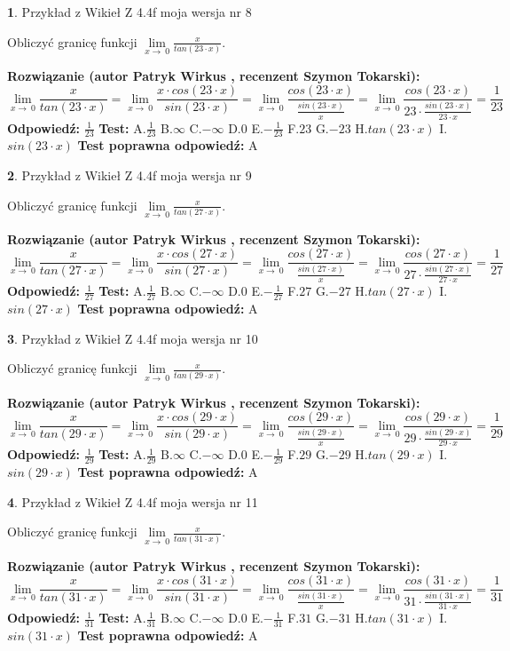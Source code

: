 \documentclass[12pt, a4paper]{article}
\theoremstyle{definition} %
\newtheorem{zad}{}
\newcommand{\zadStart}[1]{\begin{zad}#1\newline}
\newcommand{\zadStop}{\end{zad}}
\newcommand{\rozwStart}[2]{\noindent \textbf{Rozwiązanie (autor #1 , recenzent #2): }\newline}
\newcommand{\rozwStop}{\newline}
\newcommand{\odpStart}{\noindent \textbf{Odpowiedź:}\newline}
\newcommand{\odpStop}{\newline}
\newcommand{\testStart}{\noindent \textbf{Test:}\newline}
\newcommand{\testStop}{\newline}
\newcommand{\kluczStart}{\noindent \textbf{Test poprawna odpowiedź:}\newline}
\newcommand{\kluczStop}{\newline}
\begin{document}
\zadStart{Przykład z Wikieł Z 4.4f moja wersja nr 8}


Obliczyć granicę funkcji $\lim\limits_{x\to\ 0}\frac{x}{tan(23 \cdot x)}$.
\zadStop
\rozwStart{Patryk Wirkus}{Szymon Tokarski}
$$\lim\limits_{x\to\ 0}\frac{x}{tan(23 \cdot x)}=\lim\limits_{x\to\ 0}\frac{x \cdot cos(23 \cdot x)}{sin(23 \cdot x)}=\lim\limits_{x\to\ 0}\frac{cos(23 \cdot x)}{\frac{sin(23 \cdot x)}{x}}=\lim\limits_{x\to\ 0}\frac{cos(23 \cdot x)}{23 \cdot \frac{sin(23 \cdot x)}{23 \cdot x}} = \frac{1}{23}$$
\rozwStop
\odpStart
$\frac{1}{23}$
\odpStop
\testStart
A.$\frac{1}{23}$
B.$\infty$
C.$-\infty$
D.$0$
E.$-\frac{1}{23}$
F.$23$
G.$-23$
H.$tan(23 \cdot x)$
I.$sin(23 \cdot x)$
\testStop
\kluczStart
A
\kluczStop



\zadStart{Przykład z Wikieł Z 4.4f moja wersja nr 9}


Obliczyć granicę funkcji $\lim\limits_{x\to\ 0}\frac{x}{tan(27 \cdot x)}$.
\zadStop
\rozwStart{Patryk Wirkus}{Szymon Tokarski}
$$\lim\limits_{x\to\ 0}\frac{x}{tan(27 \cdot x)}=\lim\limits_{x\to\ 0}\frac{x \cdot cos(27 \cdot x)}{sin(27 \cdot x)}=\lim\limits_{x\to\ 0}\frac{cos(27 \cdot x)}{\frac{sin(27 \cdot x)}{x}}=\lim\limits_{x\to\ 0}\frac{cos(27 \cdot x)}{27 \cdot \frac{sin(27 \cdot x)}{27 \cdot x}} = \frac{1}{27}$$
\rozwStop
\odpStart
$\frac{1}{27}$
\odpStop
\testStart
A.$\frac{1}{27}$
B.$\infty$
C.$-\infty$
D.$0$
E.$-\frac{1}{27}$
F.$27$
G.$-27$
H.$tan(27 \cdot x)$
I.$sin(27 \cdot x)$
\testStop
\kluczStart
A
\kluczStop



\zadStart{Przykład z Wikieł Z 4.4f moja wersja nr 10}


Obliczyć granicę funkcji $\lim\limits_{x\to\ 0}\frac{x}{tan(29 \cdot x)}$.
\zadStop
\rozwStart{Patryk Wirkus}{Szymon Tokarski}
$$\lim\limits_{x\to\ 0}\frac{x}{tan(29 \cdot x)}=\lim\limits_{x\to\ 0}\frac{x \cdot cos(29 \cdot x)}{sin(29 \cdot x)}=\lim\limits_{x\to\ 0}\frac{cos(29 \cdot x)}{\frac{sin(29 \cdot x)}{x}}=\lim\limits_{x\to\ 0}\frac{cos(29 \cdot x)}{29 \cdot \frac{sin(29 \cdot x)}{29 \cdot x}} = \frac{1}{29}$$
\rozwStop
\odpStart
$\frac{1}{29}$
\odpStop
\testStart
A.$\frac{1}{29}$
B.$\infty$
C.$-\infty$
D.$0$
E.$-\frac{1}{29}$
F.$29$
G.$-29$
H.$tan(29 \cdot x)$
I.$sin(29 \cdot x)$
\testStop
\kluczStart
A
\kluczStop



\zadStart{Przykład z Wikieł Z 4.4f moja wersja nr 11}


Obliczyć granicę funkcji $\lim\limits_{x\to\ 0}\frac{x}{tan(31 \cdot x)}$.
\zadStop
\rozwStart{Patryk Wirkus}{Szymon Tokarski}
$$\lim\limits_{x\to\ 0}\frac{x}{tan(31 \cdot x)}=\lim\limits_{x\to\ 0}\frac{x \cdot cos(31 \cdot x)}{sin(31 \cdot x)}=\lim\limits_{x\to\ 0}\frac{cos(31 \cdot x)}{\frac{sin(31 \cdot x)}{x}}=\lim\limits_{x\to\ 0}\frac{cos(31 \cdot x)}{31 \cdot \frac{sin(31 \cdot x)}{31 \cdot x}} = \frac{1}{31}$$
\rozwStop
\odpStart
$\frac{1}{31}$
\odpStop
\testStart
A.$\frac{1}{31}$
B.$\infty$
C.$-\infty$
D.$0$
E.$-\frac{1}{31}$
F.$31$
G.$-31$
H.$tan(31 \cdot x)$
I.$sin(31 \cdot x)$
\testStop
\kluczStart
A
\kluczStop
\end{document}
